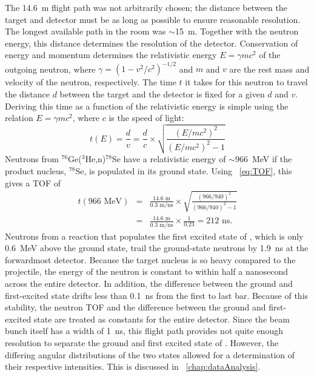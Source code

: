 The 14.6~m flight path was not arbitrarily chosen; the distance between the target and detector must be as long as possible to ensure reasonable resolution.  The longest available path in the room was $\sim$15~m.  Together with the neutron energy, this distance determines the resolution of the detector.  Conservation of energy and momentum determines the relativistic energy $E = \gamma m c^2$ of the outgoing neutron, where $\gamma=(1-v^2/c^2)^{-1/2}$ and $m$ and $v$ are the rest mass and velocity of the neutron, respectively.  The time $t$ it takes for this neutron to travel the distance $d$ between the target and the detector is fixed for a given $d$ and $v$.  Deriving this time as a function of the relativistic energy is simple using the relation $E=\gamma mc^2$, where $c$ is the speed of light:
\begin{equation}
t(E) = \frac{d}{v} =  \frac{d}{c}\times\sqrt{\frac{(E/mc^2)^2}{(E/mc^2)^2-1}} 
\label{eq:TOF}
\end{equation}
Neutrons from $^{76}$Ge($^3$He,n)$^{78}$Se have a relativistic energy of $\sim$966~MeV if the product nucleus, $^{78}$Se, is populated in its ground state.  Using {\eqn}~\ref{eq:TOF}, this gives a TOF of
\begin{eqnarray}
t(966 \text{ MeV}) &=& \frac{14.6 \text{ m}}{0.3 \text{ m/ns}}\times\sqrt{\frac{(966/940)^2}{(966/940)^2-1}} \nonumber \\
           &=& \frac{14.6 \text{ m}}{0.3 \text{ m/ns}}\times\frac{1}{0.23} = 212 \text{ ns} \nonumber.
\end{eqnarray}
Neutrons from a reaction that populates the first excited state of , which is only 0.6~MeV above the ground state, trail the ground-state neutrons by 1.9~ns at the forwardmost detector.  Because the target nucleus is so heavy compared to the projectile, the energy of the neutron is constant to within half a nanosecond across the entire detector.  In addition, the difference between the ground and first-excited state drifts less than 0.1~ns from the first to last bar.  Because of this stability, the neutron TOF and the difference between the ground and first-excited state are treated as constants for the entire detector.  Since the beam bunch itself has a width of 1~ns, this flight path provides not quite enough resolution to separate the ground and first excited state of \GeTargets. However, the differing angular distributions of the two states allowed for a determination of their respective intensities.  This is discussed in {\chap}~\ref{chap:dataAnalysis}.



